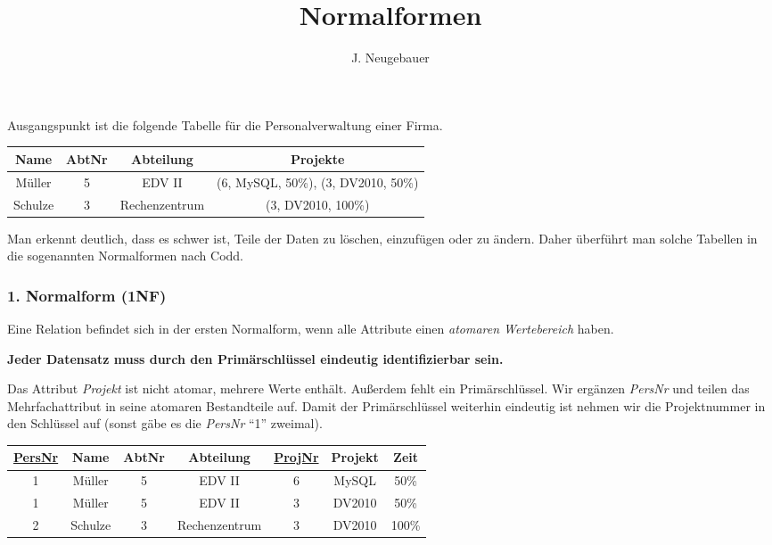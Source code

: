 \documentclass[9pt, a4paper]{scrartcl}
\author{J. Neugebauer}
\title{Normalformen}
\date{\Heute}
\begin{document}
\ReiheTitel

Ausgangspunkt ist die folgende Tabelle für die Personalverwaltung einer Firma.

\begin{center}
\begin{tabular}{|c|c|c|c|}\hline
	\rowcolor{ngb.tabelle.kopf.hg} Name & AbtNr & Abteilung & Projekte \\\hline
	Müller & 5 & EDV II & (6, MySQL, 50\%), (3, DV2010, 50\%) \\\hline
	Schulze & 3 & Rechenzentrum & (3, DV2010, 100\%) \\\hline
\end{tabular}
\end{center}

Man erkennt deutlich, dass es schwer ist, Teile der Daten zu löschen, einzufügen oder zu ändern. Daher überführt man solche Tabellen in die sogenannten Normalformen nach Codd.

\begin{rahmen}
	\subsubsection*{1. Normalform (1NF)}
	
	Eine Relation befindet sich in der ersten Normalform, wenn alle Attribute einen 
	\emph{atomaren Wertebereich} haben.
	
	\textbf{Jeder Datensatz muss durch den Primärschlüssel eindeutig identifizierbar sein.}
\end{rahmen}

Das Attribut \emph{Projekt} ist nicht atomar, mehrere Werte enthält. Außerdem fehlt ein Primärschlüssel. Wir ergänzen \emph{PersNr} und teilen das Mehrfachattribut in seine atomaren Bestandteile auf. Damit der Primärschlüssel weiterhin
eindeutig ist nehmen wir die Projektnummer in den Schlüssel auf (sonst gäbe es die \emph{PersNr} \enquote{1} zweimal).

\begin{center}
\begin{tabular}{|c|c|c|c|c|c|c|}\hline
	\rowcolor{ngb.tabelle.kopf.hg} \underline{PersNr} & Name & AbtNr & Abteilung & \underline{ProjNr} & Projekt & Zeit \\\hline
	1 & Müller & 5 & EDV II & 6 & MySQL & 50\% \\\hline
	1 & Müller & 5 & EDV II & 3 & DV2010 & 50\% \\\hline
	2 & Schulze & 3 & Rechenzentrum & 3 & DV2010 & 100\% \\\hline
\end{tabular}
\end{center}
\end{document}

